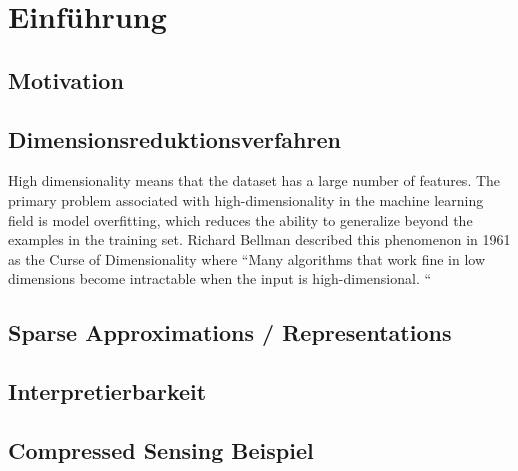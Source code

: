 \chapter{Einführung}

\cite{elad}
\cite{foucart}
\cite{hastie_elements}
\cite{gribonval}
\cite{jenatton}
\cite{johnstone}
\cite{yata}
\cite{mairal}
\cite{tibshirani_lasso}
\cite{tibshirani_uniqueness}
\cite{zou_elasticnet}
\cite{zou_sparsepca}
\cite{zou_overview}
\cite{efron_lars}

\label{introduction}

\section{Motivation}

\section{Dimensionsreduktionsverfahren}

High dimensionality means that the dataset has a large number of features. The primary problem associated with high-dimensionality in the machine learning field is model overfitting, which reduces the ability to generalize beyond the examples in the training set. Richard Bellman described this phenomenon in 1961 as the Curse of Dimensionality where “Many algorithms that work fine in low dimensions become intractable when the input is high-dimensional. “

\section{Sparse Approximations / Representations}

\section{Interpretierbarkeit}

\section{Compressed Sensing Beispiel}